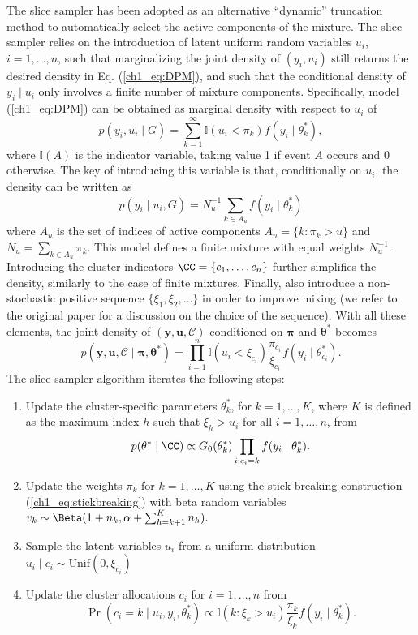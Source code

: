 The slice sampler \parencite{walker2007, kalli2011} has been adopted as an alternative ``dynamic'' truncation method to automatically select the active components of the mixture. 
The slice sampler relies on the introduction of latent uniform random variables $u_i$, $i=1,\dots,n$, such that 
marginalizing the joint density of $(y_i,u_i)$ still returns the desired density in Eq. (\ref{ch1_eq:DPM}), and such that the conditional density of $y_i\mid u_i$ only involves a finite number of mixture components.
Specifically, model (\ref{ch1_eq:DPM}) can be obtained as marginal density with respect to $u_i$ of
\begin{equation*}
p(y_i,u_i\mid G) = \sum_{k=1}^{\infty} \mathbb{I}(u_i<\pi_k) f(y_i\mid\theta^*_k),
\end{equation*}
where $\mathbb{I}(A)$ is the indicator variable, taking value 1 if event $A$ occurs and 0 otherwise. 
The key of introducing this variable is that, conditionally on $u_i$, the density can be written as
\begin{equation*}
p(y_i\mid u_i, G) = N_u^{-1} \sum_{k\in A_u} f(y_i\mid\theta^*_k)
\end{equation*}
where $A_u$ is the set of indices of active components $A_u = \{k:\pi_k >u\}$ and $N_u = \sum_{k\in A_u} \pi_k$. This model defines a finite mixture with equal weights $N_u^{-1}$.
Introducing the cluster indicators $\CC = \{c_1,\dots,c_n\}$ further simplifies the density, similarly to the case of finite mixtures. Finally, \textcite{kalli2011} also introduce a non-stochastic positive sequence $\{\xi_1,\xi_2,\dots\}$ in order to improve mixing (we refer to the original paper for a discussion on the choice of the sequence). With all these elements, the joint density of $(\bm{y},\bm{u},\mathcal{C})$ conditioned on $\bm{\pi}$ and $\bm{\theta}^*$ becomes
\begin{equation}
p(\bm{y},\bm{u},\mathcal{C} \mid \bm{\pi},\bm{\theta}^*) = \prod_{i=1}^n \mathbb{I}(u_i < \xi_{c_i}) \frac{\pi_{c_i}}{\xi_{c_i}} f(y_i\mid\theta^*_{c_i}).
\label{ch1_eq:sliceDPMlik}
\end{equation}
The slice sampler algorithm iterates the following steps:
\begin{enumerate}
	\item Update the cluster-specific parameters $\theta^*_k$, for $k=1,\dots,K$, where $K$ is defined as the maximum index $h$ such that $\xi_h > u_i$ for all $i=1,\dots,n$, from
	$$p(\theta^*\mid \CC) \propto G_0(\theta^*_k)\prod_{i:c_i=k} f(y_i\mid\theta^*_k).$$
	\item Update the weights $\pi_k$ for $k=1,\dots,K$ using the stick-breaking construction (\ref{ch1_eq:stickbreaking}) with beta random variables $v_k\sim\Beta(1+n_k, \alpha + \sum_{h=k+1}^K n_h).$
	\item Sample the latent variables $u_i$ from a uniform distribution $u_i \mid c_i \sim \mathrm{Unif}(0,\xi_{c_i})$
	\item Update the cluster allocations $c_i$ for $i=1,\dots,n$ from
	$$\Pr(c_i = k\mid u_i, y_i, \theta^*_k)\propto \mathbb{I}(k:\xi_k > u_i) \frac{\pi_k}{\xi_k} f(y_i\mid\theta^*_k).$$
\end{enumerate}



